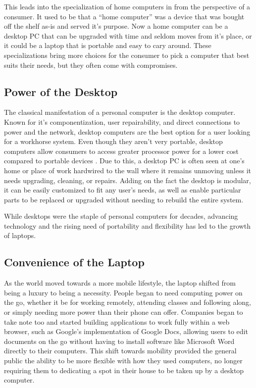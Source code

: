 This leads into the specialization of home computers in from the perspective of a consumer.
It used to be that a \enquote{home computer} was a device that was bought off the shelf as-is and served it's purpose.
Now a home computer can be a desktop PC that can be upgraded with time and seldom moves from it's place, or it could be a laptop that is portable and easy to cary around.
These specializations bring more choices for the consumer to pick a computer that best suits their needs, but they often come with compromises.

\subsection{Power of the Desktop}\label{PowerOfTheDesktop}

The classical manifestation of a personal computer is the desktop computer.
Known for it's componentization, user repairability, and direct connections to power and the network, desktop computers are the best option for a user looking for a workhorse system.
Even though they aren't very portable, desktop computers allow consumers to access greater processor power for a lower cost compared to portable devices \citep{Meyer20145RS}.
Due to this, a desktop PC is often seen at one's home or place of work hardwired to the wall where it remains unmoving unless it needs upgrading, cleaning, or repairs.
Adding on the fact the desktop is modular, it can be easily customized to fit any user's needs, as well as enable particular parts to be replaced or upgraded without needing to rebuild the entire system.

While desktops were the staple of personal computers for decades, advancing technology and the rising need of portability and flexibility has led to the growth of laptops.


\subsection{Convenience of the Laptop}\label{ConvenienceOfTheLaptop}

As the world moved towards a more mobile lifestyle, the laptop shifted from being a luxury to being a necessity.
People began to need computing power on the go, whether it be for working remotely, attending classes and following along, or simply needing more power than their phone can offer.
Companies began to take note too and started building applications to work fully within a web browser, such as Google's implementation of Google Docs, allowing users to edit documents on the go without having to install software like Microsoft Word directly to their computers.
This shift towards mobility provided the general public the ability to be more flexible with how they used computers, no longer requiring them to dedicating a spot in their house to be taken up by a desktop computer.

